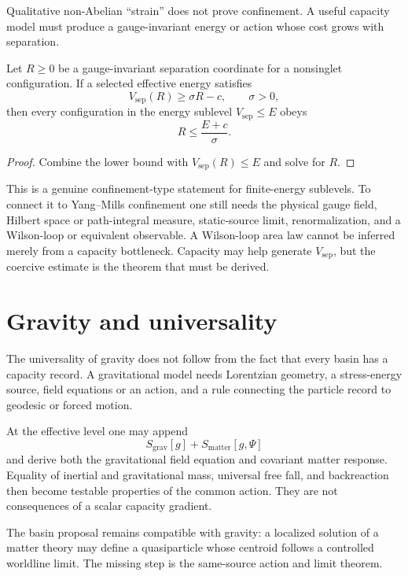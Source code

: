 \documentclass[11pt]{article}
\begin{document}
Qualitative non-Abelian ``strain'' does not prove confinement.  A useful
capacity model must produce a gauge-invariant energy or action whose cost
grows with separation.

\begin{theorem}\label{thm:confinement}
Let $R\geq0$ be a gauge-invariant separation coordinate for a nonsinglet
configuration.  If a selected effective energy satisfies
\[
 V_{\mathrm{sep}}(R)\geq\sigma R-c,
 \qquad \sigma>0,
\]
then every configuration in the energy sublevel
$V_{\mathrm{sep}}\leq E$ obeys
\[
 R\leq\frac{E+c}{\sigma}.
\]
\end{theorem}

\begin{proof}
Combine the lower bound with $V_{\mathrm{sep}}(R)\leq E$ and solve for $R$.
\end{proof}

This is a genuine confinement-type statement for finite-energy sublevels.  To
connect it to Yang--Mills confinement one still needs the physical gauge
field, Hilbert space or path-integral measure, static-source limit,
renormalization, and a Wilson-loop or equivalent observable.  A Wilson-loop
area law cannot be inferred merely from a capacity bottleneck.  Capacity may
help generate $V_{\mathrm{sep}}$, but the coercive estimate is the theorem that
must be derived.

\section{Gravity and universality}

The universality of gravity does not follow from the fact that every basin has
a capacity record.  A gravitational model needs Lorentzian geometry, a
stress-energy source, field equations or an action, and a rule connecting the
particle record to geodesic or forced motion.

At the effective level one may append
\[
 S_{\mathrm{grav}}[g]
 +S_{\mathrm{matter}}[g,\Psi]
\]
and derive both the gravitational field equation and covariant matter
response.  Equality of inertial and gravitational mass, universal free fall,
and backreaction then become testable properties of the common action.  They
are not consequences of a scalar capacity gradient.

The basin proposal remains compatible with gravity: a localized solution of a
matter theory may define a quasiparticle whose centroid follows a controlled
worldline limit.  The missing step is the same-source action and limit theorem.
\end{document}
